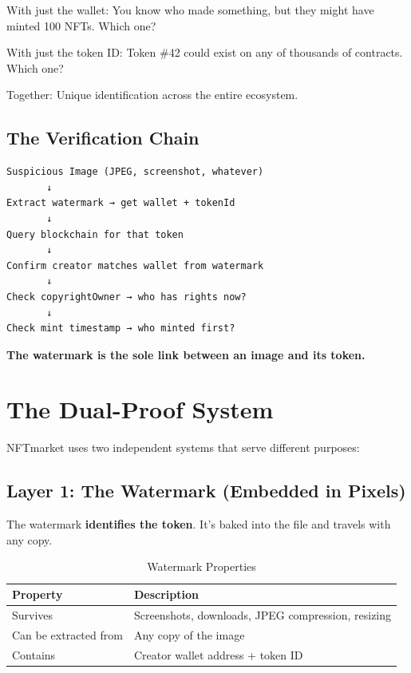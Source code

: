 \documentclass[11pt,a4paper]{article}
\begin{document}
With just the wallet: You know who made something, but they might have minted 100 NFTs. Which one?

With just the token ID: Token \#42 could exist on any of thousands of contracts. Which one?

Together: Unique identification across the entire ecosystem.

\subsection{The Verification Chain}

\begin{mdframed}[style=codeblock]
\begin{verbatim}
Suspicious Image (JPEG, screenshot, whatever)
       ↓
Extract watermark → get wallet + tokenId
       ↓
Query blockchain for that token
       ↓
Confirm creator matches wallet from watermark
       ↓
Check copyrightOwner → who has rights now?
       ↓
Check mint timestamp → who minted first?
\end{verbatim}
\end{mdframed}

\textbf{The watermark is the sole link between an image and its token.}

\newpage
\section{The Dual-Proof System}

NFTmarket uses two independent systems that serve different purposes:

\subsection{Layer 1: The Watermark (Embedded in Pixels)}

The watermark \textbf{identifies the token}. It's baked into the file and travels with any copy.

\begin{table}[h]
\centering
\begin{tabular}{@{}ll@{}}
\toprule
\textbf{Property} & \textbf{Description} \\
\midrule
Survives & Screenshots, downloads, JPEG compression, resizing \\
Can be extracted from & Any copy of the image \\
Contains & Creator wallet address + token ID \\
\bottomrule
\end{tabular}
\caption{Watermark Properties}
\end{table}
\end{document}
